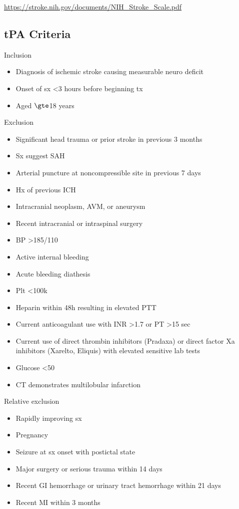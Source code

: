 \documentclass[8pt]{extarticle}
\begin{document}
\url{https://stroke.nih.gov/documents/NIH_Stroke_Scale.pdf}
\newpage

\subsection{tPA Criteria}
Inclusion
\begin{itemize}
    \item Diagnosis of ischemic stroke causing measurable neuro deficit
    \item Onset of sx <3 hours before beginning tx
    \item Aged $\gte$18 years
\end{itemize}
Exclusion
\begin{itemize}
    \item Significant head trauma or prior stroke in previous 3 months
    \item Sx suggest SAH
    \item Arterial puncture at noncompressible site in previous 7 days
    \item Hx of previous ICH
    \item Intracranial neoplasm, AVM, or aneurysm
    \item Recent intracranial or intraspinal surgery
    \item BP >185/110
    \item Active internal bleeding
    \item Acute bleeding diathesis
    \item Plt <100k
    \item Heparin within 48h resulting in elevated PTT
    \item Current anticoagulant use with INR >1.7 or PT >15 sec
    \item Current use of direct thrombin inhibitors (Pradaxa) or direct factor Xa inhibitors (Xarelto, Eliquis) with elevated sensitive lab tests
    \item Glucose <50
    \item CT demonstrates multilobular infarction
\end{itemize}
Relative exclusion
\begin{itemize}
    \item Rapidly improving sx
    \item Pregnancy
    \item Seizure at sx onset with postictal state
    \item Major surgery or serious trauma within 14 days
    \item Recent GI hemorrhage or urinary tract hemorrhage within 21 days
    \item Recent MI within 3 months
\end{itemize}
\end{document}
